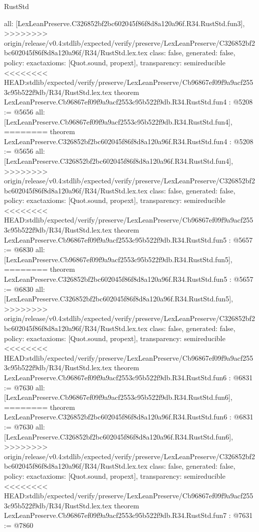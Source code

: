 \begin{lexlean}{RustStd}
\begin{coremodule}
{\begin{coremodule}
{{{{{{{  all: [LexLeanPreserve.C326852bf2bc602045f86f8d8a120a96f.R34.RustStd.fun3],
>>>>>>>> origin/release/v0.4:stdlib/expected/verify/preserve/LexLeanPreserve/C326852bf2bc602045f86f8d8a120a96f/R34/RustStd.lex.tex
  class: false,
  generated: false,
  policy: exact{axioms: [Quot.sound, propext]},
  transparency: semireducible
}
<<<<<<<< HEAD:stdlib/expected/verify/preserve/LexLeanPreserve/Cb96867ef09f9a9acf2553c95b522f9db/R34/RustStd.lex.tex
theorem LexLeanPreserve.Cb96867ef09f9a9acf2553c95b522f9db.R34.RustStd.fun4 : @5208 := @5656 {
  all: [LexLeanPreserve.Cb96867ef09f9a9acf2553c95b522f9db.R34.RustStd.fun4],
========
theorem LexLeanPreserve.C326852bf2bc602045f86f8d8a120a96f.R34.RustStd.fun4 : @5208 := @5656 {
  all: [LexLeanPreserve.C326852bf2bc602045f86f8d8a120a96f.R34.RustStd.fun4],
>>>>>>>> origin/release/v0.4:stdlib/expected/verify/preserve/LexLeanPreserve/C326852bf2bc602045f86f8d8a120a96f/R34/RustStd.lex.tex
  class: false,
  generated: false,
  policy: exact{axioms: [Quot.sound, propext]},
  transparency: semireducible
}
<<<<<<<< HEAD:stdlib/expected/verify/preserve/LexLeanPreserve/Cb96867ef09f9a9acf2553c95b522f9db/R34/RustStd.lex.tex
theorem LexLeanPreserve.Cb96867ef09f9a9acf2553c95b522f9db.R34.RustStd.fun5 : @5657 := @6830 {
  all: [LexLeanPreserve.Cb96867ef09f9a9acf2553c95b522f9db.R34.RustStd.fun5],
========
theorem LexLeanPreserve.C326852bf2bc602045f86f8d8a120a96f.R34.RustStd.fun5 : @5657 := @6830 {
  all: [LexLeanPreserve.C326852bf2bc602045f86f8d8a120a96f.R34.RustStd.fun5],
>>>>>>>> origin/release/v0.4:stdlib/expected/verify/preserve/LexLeanPreserve/C326852bf2bc602045f86f8d8a120a96f/R34/RustStd.lex.tex
  class: false,
  generated: false,
  policy: exact{axioms: [Quot.sound, propext]},
  transparency: semireducible
}
<<<<<<<< HEAD:stdlib/expected/verify/preserve/LexLeanPreserve/Cb96867ef09f9a9acf2553c95b522f9db/R34/RustStd.lex.tex
theorem LexLeanPreserve.Cb96867ef09f9a9acf2553c95b522f9db.R34.RustStd.fun6 : @6831 := @7630 {
  all: [LexLeanPreserve.Cb96867ef09f9a9acf2553c95b522f9db.R34.RustStd.fun6],
========
theorem LexLeanPreserve.C326852bf2bc602045f86f8d8a120a96f.R34.RustStd.fun6 : @6831 := @7630 {
  all: [LexLeanPreserve.C326852bf2bc602045f86f8d8a120a96f.R34.RustStd.fun6],
>>>>>>>> origin/release/v0.4:stdlib/expected/verify/preserve/LexLeanPreserve/C326852bf2bc602045f86f8d8a120a96f/R34/RustStd.lex.tex
  class: false,
  generated: false,
  policy: exact{axioms: [Quot.sound, propext]},
  transparency: semireducible
}
<<<<<<<< HEAD:stdlib/expected/verify/preserve/LexLeanPreserve/Cb96867ef09f9a9acf2553c95b522f9db/R34/RustStd.lex.tex
theorem LexLeanPreserve.Cb96867ef09f9a9acf2553c95b522f9db.R34.RustStd.fun7 : @7631 := @7860 {
}}}}}}}}}}
\end{coremodule}}
\end{coremodule}
\end{lexlean}
